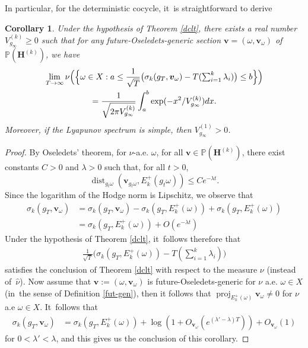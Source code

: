 \documentclass[10pt]{amsart}
\DeclareMathOperator{\dist}{dist}
\DeclareMathOperator{\proj}{proj}
\theoremstyle{plain}
\newtheorem{cor}[thm]{Corollary}
\theoremstyle{definition}
\numberwithin{equation}{subsection}
\newcommand\bP{\mathbb{P}}
\newcommand{\bfH}{\boldsymbol{H}}
\newcommand{\bfv}{\boldsymbol{v}}
\newcommand{\defeq}{:=}
\begin{document}
In particular, for the deterministic cocycle, it~is straightforward to derive

\begin{cor}
Under the hypothesis of Theorem \ref{dclt}, there exists a real number $V^{(k)}_{g_\infty} \geq 0$ such that for any future-Oseledets-generic section $\bfv=(\omega,\bfv_{\omega})$ of $\bP(\bfH^{(k)})$, we have
\begin{multline*}
\lim_{T\to\infty} \nu\Bigl(\Bigl\{\omega\in X :a \leq \frac{1}{\sqrt{T}} \bigl(\sigma_k(g_{T}, \bfv_\omega)- T(\textstyle\sum_{i=1}^k \lambda_i) \bigr) \leq b\Bigr\}\Bigr)
\\= \frac{1}{\sqrt{2\pi V^{(k)}_{g_\infty}}}\int_a^b\exp(-x^2/ V^{(k)}_{g_\infty})dx.
\end{multline*}
Moreover, if the Lyapunov spectrum is simple, then $V^{(1)}_{g_\infty} > 0$.
\end{cor}

\begin{proof}
By Oseledets' theorem, for $\nu$-a.e. $\omega$, for all $\bfv \in \bP(\bfH^{(k)})$, there exist constants $C>0$ and $\lambda >0$ such that, for all $t>0$,
\[
\dist_{g_t\omega} (\bfv_{g_t \omega}, E^+_k(g_t \omega)) \leq C e^{-\lambda t}.
\]
Since the logarithm of the Hodge norm is Lipschitz, we observe that
\begin{align*}
\sigma_k(g_{T}, \bfv_\omega)&= \sigma_k(g_{T}, \bfv_\omega)-\sigma_k(g_{T}, E^+_k(\omega))+ \sigma_k(g_{T}, E^+_k(\omega))\\
&= \sigma_k(g_{T}, E^+_k(\omega))+O(e^{-\lambda t})
\end{align*}
Under the hypothesis of Theorem \ref{dclt}, it~follows therefore that
\begin{align*}
\frac{1}{\sqrt{T}} \bigl(\sigma_k(g_{T}, E^+_k(\omega))- T(\textstyle\sum_{i=1}^k \lambda_i) \bigr)
\end{align*}
satisfies the conclusion of Theorem \ref{dclt} with respect to the measure $\nu$ (instead of~$\hat{\nu}$). Now assume that $\bfv\defeq(\omega,\bfv_{\omega})$ is future-Oseledets-generic for $\nu$ a.e. $\omega\in X$ (in~the sense of Definition \ref{fut-gen}), then it follows that $\proj_{E^+_k(\omega)}\bfv_{ \omega} \neq 0$ for $\nu$ a.e $\omega\in X$. It~follows that
\begin{align*}
\sigma_k(g_{T}, \bfv_\omega)&= \sigma_k(g_{T}, E^+_k(\omega))+\log(1+O_{\bfv_\omega}(e^{(\lambda'-\lambda)T}))+O_{\bfv_\omega}(1)
\end{align*}
for $0<\lambda'<\lambda$, and this gives us the conclusion of this corollary.
\end{proof}
\end{document}

